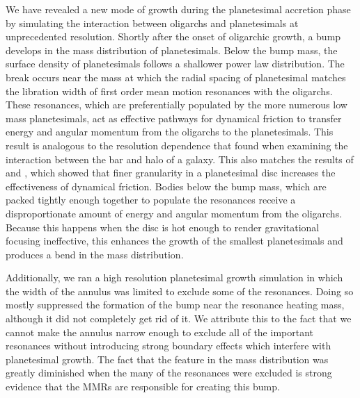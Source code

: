 We have revealed a new mode of growth during the planetesimal accretion phase by simulating the interaction between 
oligarchs and planetesimals at unprecedented resolution. Shortly after the onset of oligarchic growth, a bump develops in the 
mass distribution of planetesimals. Below the bump mass, the surface density of planetesimals follows a shallower power law 
distribution. The break occurs near the mass at which the radial spacing of planetesimal matches the libration width of first order 
mean motion resonances with the oligarchs. These resonances, which are preferentially populated by the more numerous low 
mass planetesimals, act as effective pathways for dynamical friction to transfer energy and angular momentum from the 
oligarchs to the planetesimals. This result is analogous to the resolution dependence that \cite{weinberg07a, weinberg07b} 
found when examining the interaction between the bar and halo of a galaxy. This also matches the results of \cite{obrien06} and 
\cite{cionco02}, which showed that finer granularity in a planetesimal disc increases the effectiveness of dynamical friction. 
Bodies below the bump mass, which are packed tightly enough together to populate the resonances receive a disproportionate 
amount of energy and angular momentum from the oligarchs. Because this happens when the disc is hot enough to render 
gravitational focusing ineffective, this enhances the growth of the smallest planetesimals and produces a bend in the mass 
distribution.

Additionally, we ran a high resolution planetesimal growth simulation in which the width of the annulus was limited to exclude 
some of the resonances. Doing so mostly suppressed the formation of the bump near the resonance heating mass, although it 
did not completely get rid of it. We attribute this to the fact that we cannot make the annulus narrow enough to exclude all of the 
important resonances without introducing strong boundary effects which interfere with planetesimal growth. The fact that the 
feature in the mass distribution was greatly diminished when the many of the resonances were excluded is strong evidence that 
the MMRs are responsible for creating this bump.

